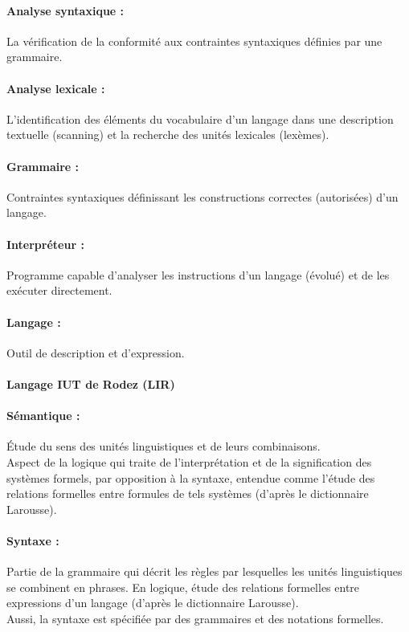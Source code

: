 \documentclass[11pt,a4paper,titlepage,openright]{report}
\begin{document}
        \paragraph{Analyse syntaxique :}
        La vérification de la conformité aux contraintes syntaxiques définies par une grammaire.

        \paragraph{Analyse lexicale :}
        L’identification des éléments du vocabulaire d’un langage dans une description textuelle (scanning) et la recherche des unités lexicales (lexèmes).

        \paragraph{Grammaire :}
        Contraintes syntaxiques définissant les constructions correctes (autorisées) d’un langage.

        \paragraph{Interpréteur :}
        Programme capable d’analyser les instructions d’un langage (évolué) et de les exécuter directement.

        \paragraph{Langage :}
        Outil de description et d’expression.

        \paragraph{Langage IUT de Rodez (LIR)}

        \paragraph{Sémantique :}
        Étude du sens des unités linguistiques et de leurs combinaisons.
        \\Aspect de la logique qui traite de l'interprétation et de la signification des systèmes formels, par opposition à la syntaxe, entendue comme l'étude des relations formelles entre formules de tels systèmes (d’après le dictionnaire Larousse).

        \paragraph{Syntaxe :}
        Partie de la grammaire qui décrit les règles par lesquelles les unités linguistiques se combinent en phrases. En logique, étude des relations formelles entre expressions d'un langage (d’après le dictionnaire Larousse).
        \\Aussi, la syntaxe est spécifiée par des grammaires et des notations formelles.
\end{document}

